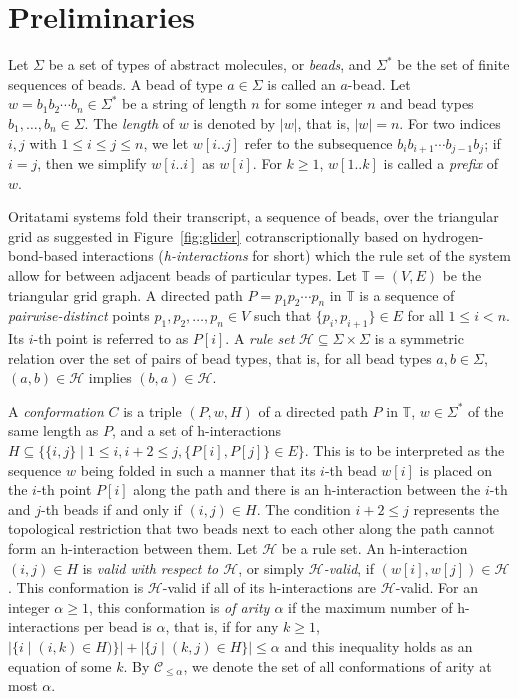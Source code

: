 	\section{Preliminaries}

Let $\Sigma$ be a set of types of abstract molecules, or \textit{beads}, and $\Sigma^*$ be the set of finite sequences of beads. 
A bead of type $a \in \Sigma$ is called an $a$-bead. 
Let $w = b_1 b_2\cdots b_n \in \Sigma^*$ be a string of length $n$ for some integer $n$ and bead types $b_1, \ldots, b_n \in \Sigma$.
The \textit{length} of $w$ is denoted by $|w|$, that is, $|w| = n$. 
For two indices $i,j$ with $1\leq i \leq j \leq n$, we let $w[i..j]$ refer to the subsequence $b_i b_{i+1} \cdots b_{j-1} b_{j}$; if $i=j$, then we simplify $w[i..i]$ as $w[i]$.
For $k \ge 1$, $w[1..k]$ is called a \textit{prefix} of $w$. 

Oritatami systems fold their transcript, a sequence of beads, over the triangular grid as suggested in Figure~\ref{fig:glider} cotranscriptionally based on hydrogen-bond-based interactions (\textit{h-interactions} for short) which the rule set of the system allow for between adjacent beads of particular types. 
Let $\mathbb{T} = (V, E)$ be the triangular grid graph. 
A directed path $P = p_1 p_2 \cdots p_n$ in $\mathbb{T}$ is a sequence of \textit{pairwise-distinct} points $p_1, p_2, \ldots, p_n \in V$ such that $\{p_i, p_{i+1}\} \in E$ for all $1 \leq i < n$.
Its $i$-th point is referred to as $P[i]$. 
A \textit{rule set} $\mathcal{H} \subseteq \Sigma \times \Sigma$ is a symmetric relation over the set of pairs of bead types, that is, for all bead types $a, b \in \Sigma$, $(a, b) \in \mathcal{H}$ implies $(b, a) \in \mathcal{H}$. 

A \textit{conformation} $C$ is a triple $(P, w, H)$ of a directed path $P$ in $\mathbb{T}$, $w \in \Sigma^*$ of the same length as $P$, and a set of h-interactions $H \subseteq \{\{i,j\} \mid 1 \leq i, i+2 \leq j, \{P[i], P[j]\} \in E\}$.
This is to be interpreted as the sequence $w$ being folded in such a manner that its $i$-th bead $w[i]$ is placed on the $i$-th point $P[i]$ along the path and there is an h-interaction between the $i$-th and $j$-th beads if and only if $(i, j) \in H$. 
The condition $i+2 \leq j$ represents the topological restriction that two beads next to each other along the path cannot form an h-interaction between them.
Let $\mathcal{H}$ be a rule set. 
An h-interaction $(i, j) \in H$ is \textit{valid with respect to $\mathcal{H}$}, or simply \textit{$\mathcal{H}$-valid}, if $(w[i], w[j]) \in \mathcal{H}$. 
This conformation is $\mathcal{H}$-valid if all of its h-interactions are $\mathcal{H}$-valid. 
For an integer $\alpha \ge 1$, this conformation is \textit{of arity $\alpha$} if the maximum number of h-interactions per bead is $\alpha$, that is, if for any $k \ge 1$, $|\{i \mid (i, k) \in H)\}| + |\{j \mid (k, j) \in H\}| \le \alpha$ and this inequality holds as an equation of some $k$. 
By $\mathcal{C}_{\le \alpha}$, we denote the set of all conformations of arity at most $\alpha$.

